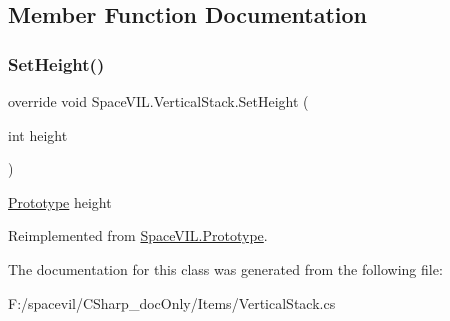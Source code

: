 \subsection{Member Function Documentation}
\mbox{\label{class_space_v_i_l_1_1_vertical_stack_a1e2360b005a6fb8e503dc60d27f1f021}} 
\subsubsection{\texorpdfstring{Set\+Height()}{SetHeight()}}
{\footnotesize\ttfamily override void Space\+V\+I\+L.\+Vertical\+Stack.\+Set\+Height (\begin{DoxyParamCaption}\item[{int}]{height }\end{DoxyParamCaption})\hspace{0.3cm}{\ttfamily [virtual]}}



\mbox{\hyperlink{class_space_v_i_l_1_1_prototype}{Prototype}} height 



Reimplemented from \mbox{\hyperlink{class_space_v_i_l_1_1_prototype_adc0adcbd1c3800d9525798ba7be5832a}{Space\+V\+I\+L.\+Prototype}}.



The documentation for this class was generated from the following file\+:\begin{DoxyCompactItemize}
\item 
F\+:/spacevil/\+C\+Sharp\+\_\+doc\+Only/\+Items/Vertical\+Stack.\+cs\end{DoxyCompactItemize}
